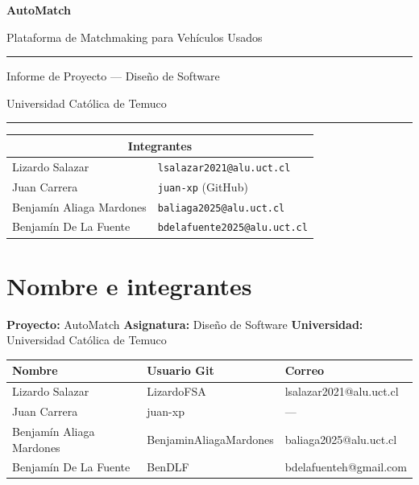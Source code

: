 \documentclass[12pt,a4paper]{article}
\begin{document}
\begin{titlepage}
  \thispagestyle{empty}
  \centering
  \vspace*{2.5cm}
  {\Huge\bfseries\sffamily AutoMatch\par}
  \vspace{0.5cm}
  {\large\sffamily Plataforma de Matchmaking para Vehículos Usados\par}
  \vspace{1.2cm}
  \rule{\textwidth}{0.4pt}
  \vspace{0.4cm}
  {\normalsize\sffamily Informe de Proyecto --- Diseño de Software\par}
  {\normalsize\sffamily Universidad Católica de Temuco\par}
  \vspace{0.4cm}
  \rule{\textwidth}{0.4pt}
  \vspace{2cm}
  \begin{tabular}{ll}
    \toprule
    \multicolumn{2}{c}{\textbf{\sffamily Integrantes}} \\
    \midrule
    Lizardo Salazar            & \texttt{lsalazar2021@alu.uct.cl}  \\
    Juan Carrera               & \texttt{juan-xp} (GitHub)          \\
    Benjamín Aliaga Mardones   & \texttt{baliaga2025@alu.uct.cl}    \\
    Benjamín De La Fuente      & \texttt{bdelafuente2025@alu.uct.cl}    \\
    \bottomrule
  \end{tabular}
  \vfill
  {\normalsize{}\par}
\end{titlepage}

\tableofcontents
\newpage

\section{Nombre e integrantes}

\textbf{Proyecto:} AutoMatch \quad
\textbf{Asignatura:} Diseño de Software \quad
\textbf{Universidad:} Universidad Católica de Temuco

\begin{center}
\begin{tabular}{lll}
  \toprule
  \textbf{Nombre} & \textbf{Usuario Git} & \textbf{Correo} \\
  \midrule
  Lizardo Salazar            & LizardoFSA             & lsalazar2021@alu.uct.cl \\
  Juan Carrera               & juan-xp                & ---                     \\
  Benjamín Aliaga Mardones   & BenjaminAliagaMardones & baliaga2025@alu.uct.cl  \\
  Benjamín De La Fuente      & BenDLF                 & bdelafuenteh@gmail.com  \\
  \bottomrule
\end{tabular}
\end{center}
\end{document}
